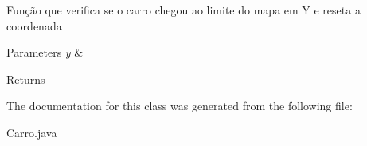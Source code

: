 Função que verifica se o carro chegou ao limite do mapa em Y e reseta a coordenada 
\begin{DoxyParams}{Parameters}
{\em y} & \\
\hline
\end{DoxyParams}
\begin{DoxyReturn}{Returns}

\end{DoxyReturn}


The documentation for this class was generated from the following file\+:\begin{DoxyCompactItemize}
\item 
Carro.\+java\end{DoxyCompactItemize}
